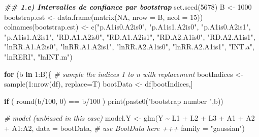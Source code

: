 \documentclass[
]{book}
\newenvironment{Shaded}{\begin{snugshade}}{\end{snugshade}}
\newcommand{\AttributeTok}[1]{\textcolor[rgb]{0.77,0.63,0.00}{#1}}
\newcommand{\CommentTok}[1]{\textcolor[rgb]{0.56,0.35,0.01}{\textit{#1}}}
\newcommand{\ConstantTok}[1]{\textcolor[rgb]{0.00,0.00,0.00}{#1}}
\newcommand{\ControlFlowTok}[1]{\textcolor[rgb]{0.13,0.29,0.53}{\textbf{#1}}}
\newcommand{\DecValTok}[1]{\textcolor[rgb]{0.00,0.00,0.81}{#1}}
\newcommand{\DocumentationTok}[1]{\textcolor[rgb]{0.56,0.35,0.01}{\textbf{\textit{#1}}}}
\newcommand{\FunctionTok}[1]{\textcolor[rgb]{0.00,0.00,0.00}{#1}}
\newcommand{\NormalTok}[1]{#1}
\newcommand{\OtherTok}[1]{\textcolor[rgb]{0.56,0.35,0.01}{#1}}
\newcommand{\SpecialCharTok}[1]{\textcolor[rgb]{0.00,0.00,0.00}{#1}}
\newcommand{\StringTok}[1]{\textcolor[rgb]{0.31,0.60,0.02}{#1}}
\begin{document}
\begin{Shaded}
\begin{Highlighting}[]
\DocumentationTok{\#\# 1.e) Intervalles de confiance par bootstrap}
    \FunctionTok{set.seed}\NormalTok{(}\DecValTok{5678}\NormalTok{)}
\NormalTok{    B }\OtherTok{\textless{}{-}} \DecValTok{1000}
\NormalTok{    bootstrap.est }\OtherTok{\textless{}{-}} \FunctionTok{data.frame}\NormalTok{(}\FunctionTok{matrix}\NormalTok{(}\ConstantTok{NA}\NormalTok{, }\AttributeTok{nrow =}\NormalTok{ B, }\AttributeTok{ncol =} \DecValTok{15}\NormalTok{))}
    \FunctionTok{colnames}\NormalTok{(bootstrap.est) }\OtherTok{\textless{}{-}} \FunctionTok{c}\NormalTok{(}\StringTok{"p.A1is0.A2is0"}\NormalTok{, }\StringTok{"p.A1is1.A2is0"}\NormalTok{, }\StringTok{"p.A1is0.A2is1"}\NormalTok{, }\StringTok{"p.A1is1.A2is1"}\NormalTok{,}
                                 \StringTok{"RD.A1.A2is0"}\NormalTok{, }\StringTok{"RD.A1.A2is1"}\NormalTok{, }\StringTok{"RD.A2.A1is0"}\NormalTok{, }\StringTok{"RD.A2.A1is1"}\NormalTok{,}
                                 \StringTok{"lnRR.A1.A2is0"}\NormalTok{, }\StringTok{"lnRR.A1.A2is1"}\NormalTok{, }\StringTok{"lnRR.A2.A1is0"}\NormalTok{, }\StringTok{"lnRR.A2.A1is1"}\NormalTok{,}
                                 \StringTok{"INT.a"}\NormalTok{, }\StringTok{"lnRERI"}\NormalTok{, }\StringTok{"lnINT.m"}\NormalTok{)}

    \ControlFlowTok{for}\NormalTok{ (b }\ControlFlowTok{in} \DecValTok{1}\SpecialCharTok{:}\NormalTok{B)\{}
      \CommentTok{\# sample the indices 1 to n with replacement}
\NormalTok{      bootIndices }\OtherTok{\textless{}{-}} \FunctionTok{sample}\NormalTok{(}\DecValTok{1}\SpecialCharTok{:}\FunctionTok{nrow}\NormalTok{(df), }\AttributeTok{replace=}\NormalTok{T)}
\NormalTok{      bootData }\OtherTok{\textless{}{-}}\NormalTok{ df[bootIndices,]}

      \ControlFlowTok{if}\NormalTok{ ( }\FunctionTok{round}\NormalTok{(b}\SpecialCharTok{/}\DecValTok{100}\NormalTok{, }\DecValTok{0}\NormalTok{) }\SpecialCharTok{==}\NormalTok{ b}\SpecialCharTok{/}\DecValTok{100}\NormalTok{ ) }\FunctionTok{print}\NormalTok{(}\FunctionTok{paste0}\NormalTok{(}\StringTok{"bootstrap number "}\NormalTok{,b))}

      \CommentTok{\# model (unbiased in this case)}
\NormalTok{      model.Y }\OtherTok{\textless{}{-}} \FunctionTok{glm}\NormalTok{(Y }\SpecialCharTok{\textasciitilde{}}\NormalTok{ L1 }\SpecialCharTok{+}\NormalTok{ L2 }\SpecialCharTok{+}\NormalTok{ L3 }\SpecialCharTok{+}\NormalTok{ A1 }\SpecialCharTok{+}\NormalTok{ A2 }\SpecialCharTok{+}\NormalTok{ A1}\SpecialCharTok{:}\NormalTok{A2,}
                     \AttributeTok{data =}\NormalTok{ bootData,                    }\CommentTok{\# use BootData here +++}
                     \AttributeTok{family =} \StringTok{"gaussian"}\NormalTok{)}


\end{Highlighting}
\end{Shaded}
\end{document}
